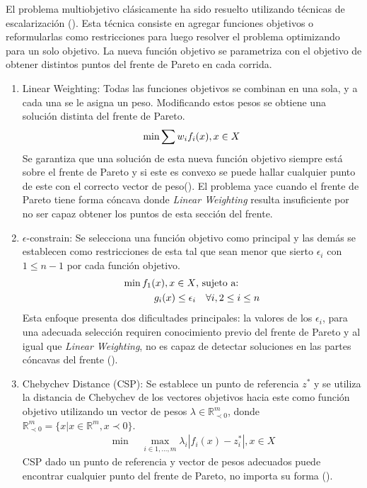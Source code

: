 El problema multiobjetivo cl\'asicamente ha sido resuelto utilizando t\'ecnicas de escalarizaci\'on (\cite{miettinen2012nonlinear}). Esta t\'ecnica consiste  en agregar funciones objetivos o  reformularlas como restricciones para luego resolver el problema optimizando para un solo objetivo. La nueva funci\'on objetivo se parametriza con el objetivo de obtener distintos puntos del frente de Pareto en cada corrida.
\begin{enumerate}
    \item Linear Weighting: Todas las funciones objetivos se combinan en una sola, y a cada una se le asigna un peso. Modificando estos pesos se obtiene una soluci\'on distinta del frente de Pareto.
    \begin{equation*}
        \min \sum w_i f_i(x), \space x \in X
    \end{equation*}
    Se garantiza que una soluci\'on de esta nueva funci\'on objetivo siempre est\'a sobre el frente de Pareto  y si este es convexo se puede hallar cualquier punto de este con el correcto vector de peso(\cite{emmerich2018tutorial}). El problema yace cuando el frente de Pareto tiene forma c\'oncava donde \textit{Linear Weighting} resulta insuficiente por no ser capaz obtener los puntos de esta secci\'on del frente.

    \item $\epsilon$-constrain: Se selecciona una funci\'on objetivo como principal y las dem\'as se establecen como restricciones de esta tal que sean menor que sierto $\epsilon_i$ con $1 \leq n - 1$ por cada funci\'on objetivo.
    \begin{align*}
            \min  f_1(x), \space x \in X  & \text{, sujeto a:}   \\
            g_i(x) \leq \epsilon_i & \quad  \forall i, 2 \leq i \leq n
    \end{align*}
    Esta enfoque presenta dos dificultades principales: la valores de los $\epsilon_i$, para una adecuada selecci\'on requiren conocimiento previo del frente de Pareto y al igual que \textit{Linear Weighting}, no es capaz de detectar soluciones en las partes c\'oncavas del frente (\cite{emmerich2018tutorial}).

\item Chebychev Distance (CSP): Se establece un punto de referencia $z^*$ y se utiliza la distancia de Chebychev de los vectores objetivos hacia este como funci\'on objetivo utilizando un vector de pesos $\lambda \in \mathbb{R}^m_{\prec 0}$, donde $\mathbb{R}^m_{\prec 0} = \{x | x \in \mathbb{R}^m, x \prec 0 \}$. 
    \begin{align*}
        \min \quad \max_{i \in {1,...,m}} \lambda_i |f_i(x) - z^*_i|, x \in X 
    \end{align*}
    CSP dado un punto de referencia y vector de pesos adecuados puede encontrar cualquier punto del frente de Pareto, no importa su forma (\cite{emmerich2018tutorial}).
\end{enumerate}

